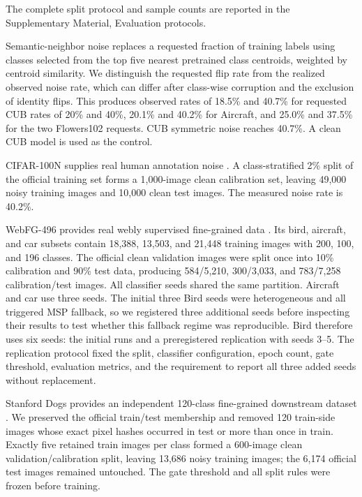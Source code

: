 \documentclass[review,times]{elsarticle}
\begin{document}
The complete split protocol and sample counts are reported in the Supplementary Material, Evaluation protocols.

Semantic-neighbor noise replaces a requested fraction of training labels using classes selected from the top five nearest pretrained class centroids, weighted by centroid similarity. We distinguish the requested flip rate from the realized observed noise rate, which can differ after class-wise corruption and the exclusion of identity flips. This produces observed rates of 18.5\% and 40.7\% for requested CUB rates of 20\% and 40\%, 20.1\% and 40.2\% for Aircraft, and 25.0\% and 37.5\% for the two Flowers102 requests. CUB symmetric noise reaches 40.7\%. A clean CUB model is used as the control.

CIFAR-100N supplies real human annotation noise \citep{wei2022cifar100n}. A class-stratified 2\% split of the official training set forms a 1,000-image clean calibration set, leaving 49,000 noisy training images and 10,000 clean test images. The measured noise rate is 40.2\%.

WebFG-496 provides real webly supervised fine-grained data \citep{sun2021webfg}. Its bird, aircraft, and car subsets contain 18,388, 13,503, and 21,448 training images with 200, 100, and 196 classes. The official clean validation images were split once into 10\% calibration and 90\% test data, producing 584/5,210, 300/3,033, and 783/7,258 calibration/test images. All classifier seeds shared the same partition. Aircraft and car use three seeds. The initial three Bird seeds were heterogeneous and all triggered MSP fallback, so we registered three additional seeds before inspecting their results to test whether this fallback regime was reproducible. Bird therefore uses six seeds: the initial runs and a preregistered replication with seeds 3--5. The replication protocol fixed the split, classifier configuration, epoch count, gate threshold, evaluation metrics, and the requirement to report all three added seeds without replacement.

Stanford Dogs provides an independent 120-class fine-grained downstream dataset \citep{khosla2011dogs}. We preserved the official train/test membership and removed 120 train-side images whose exact pixel hashes occurred in test or more than once in train. Exactly five retained train images per class formed a 600-image clean validation/calibration split, leaving 13,686 noisy training images; the 6,174 official test images remained untouched. The gate threshold and all split rules were frozen before training.
\end{document}
